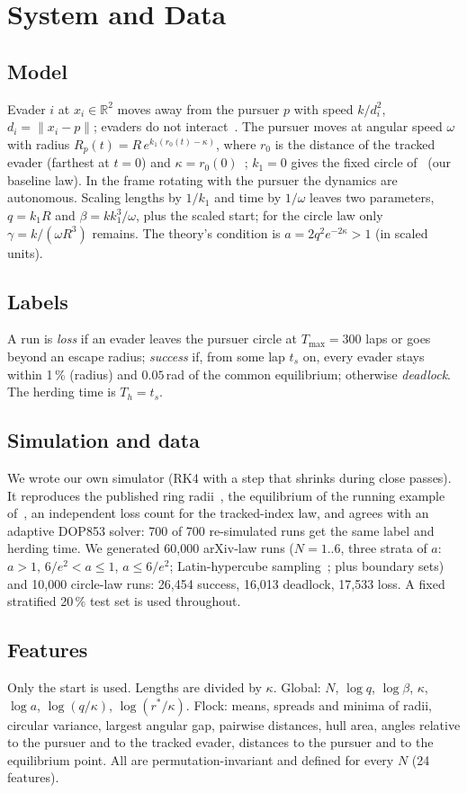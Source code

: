\documentclass[conference]{IEEEtran}
\begin{document}
\section{System and Data}
\subsection{Model}
Evader $i$ at $x_i\in\mathbb{R}^2$ moves away from the pursuer $p$ with speed $k/d_i^2$, $d_i=\|x_i-p\|$; evaders do
not interact~\cite{singh2024cdc}. The pursuer moves at angular speed $\omega$ with radius
$R_p(t)=R\,e^{k_1(r_0(t)-\kappa)}$, where $r_0$ is the distance of the tracked evader (farthest at $t=0$) and
$\kappa=r_0(0)$~\cite{singh2025arxiv}; $k_1=0$ gives the fixed circle of~\cite{singh2024cdc} (our baseline law).
In the frame rotating with the pursuer the dynamics are autonomous. Scaling lengths by $1/k_1$ and time by $1/\omega$
leaves two parameters, $q=k_1R$ and $\beta=k k_1^3/\omega$, plus the scaled start; for the circle law only
$\gamma=k/(\omega R^3)$ remains. The theory's condition is $a=2q^2e^{-2\kappa}>1$ (in scaled units).

\subsection{Labels}
A run is \emph{loss} if an evader leaves the pursuer circle at $T_{\max}=300$ laps or goes beyond an escape radius;
\emph{success} if, from some lap $t_s$ on, every evader stays within 1\,\% (radius) and $0.05$\,rad of the common
equilibrium; otherwise \emph{deadlock}. The herding time is $T_h=t_s$.

\subsection{Simulation and data}
We wrote our own simulator (RK4 with a step that shrinks during close passes). It reproduces the published ring
radii~\cite{singh2024cdc}, the equilibrium of the running example of~\cite{singh2025arxiv}, an independent
loss count for the tracked-index law, and agrees with an adaptive DOP853 solver: 700 of 700 re-simulated runs get the
same label and herding time. We generated 60{,}000 arXiv-law runs ($N=1..6$, three strata of $a$: $a>1$,
$6/e^2<a\le1$, $a\le6/e^2$; Latin-hypercube sampling~\cite{mckay1979}; plus boundary sets) and 10{,}000 circle-law
runs: 26{,}454 success, 16{,}013 deadlock, 17{,}533 loss. A fixed stratified 20\,\% test set is used throughout.

\subsection{Features}
Only the start is used. Lengths are divided by $\kappa$. Global: $N$, $\log q$, $\log\beta$, $\kappa$, $\log a$,
$\log(q/\kappa)$, $\log(r^*/\kappa)$. Flock: means, spreads and minima of radii, circular variance, largest angular
gap, pairwise distances, hull area, angles relative to the pursuer and to the tracked evader, distances to the
pursuer and to the equilibrium point. All are permutation-invariant and defined for every $N$ (24 features).
\end{document}
